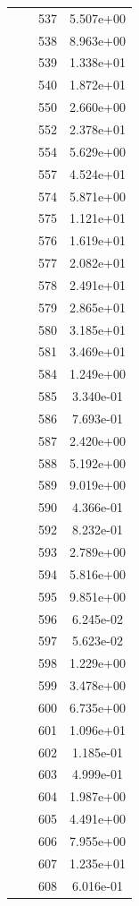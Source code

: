 \documentclass[12pt]{article}
\begin{document}
\begin{longtable}{@{}cccc@{}}
 &  & 537 & 5.507e+00 \\
 &  & 538 & 8.963e+00 \\
 &  & 539 & 1.338e+01 \\
 &  & 540 & 1.872e+01 \\
 &  & 550 & 2.660e+00 \\
 &  & 552 & 2.378e+01 \\
 &  & 554 & 5.629e+00 \\
 &  & 557 & 4.524e+01 \\
 &  & 574 & 5.871e+00 \\
 &  & 575 & 1.121e+01 \\
 &  & 576 & 1.619e+01 \\
 &  & 577 & 2.082e+01 \\
 &  & 578 & 2.491e+01 \\
 &  & 579 & 2.865e+01 \\
 &  & 580 & 3.185e+01 \\
 &  & 581 & 3.469e+01 \\
 &  & 584 & 1.249e+00 \\
 &  & 585 & 3.340e-01 \\
 &  & 586 & 7.693e-01 \\
 &  & 587 & 2.420e+00 \\
 &  & 588 & 5.192e+00 \\
 &  & 589 & 9.019e+00 \\
 &  & 590 & 4.366e-01 \\
 &  & 592 & 8.232e-01 \\
 &  & 593 & 2.789e+00 \\
 &  & 594 & 5.816e+00 \\
 &  & 595 & 9.851e+00 \\
 &  & 596 & 6.245e-02 \\
 &  & 597 & 5.623e-02 \\
 &  & 598 & 1.229e+00 \\
 &  & 599 & 3.478e+00 \\
 &  & 600 & 6.735e+00 \\
 &  & 601 & 1.096e+01 \\
 &  & 602 & 1.185e-01 \\
 &  & 603 & 4.999e-01 \\
 &  & 604 & 1.987e+00 \\
 &  & 605 & 4.491e+00 \\
 &  & 606 & 7.955e+00 \\
 &  & 607 & 1.235e+01 \\
 &  & 608 & 6.016e-01 \\

\end{longtable}
\end{document}
